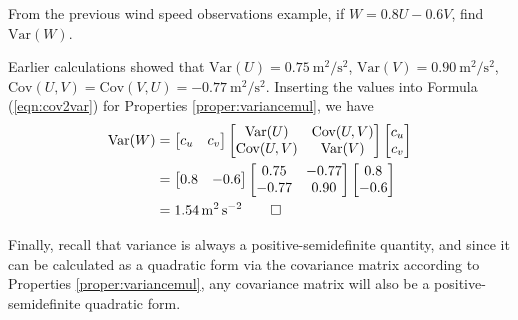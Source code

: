 \begin{exmp}
From the previous wind speed observations example, if $W = 0.8U-0.6V$, find $\text{Var}(W)$.
\end{exmp}
\begin{solution}
Earlier calculations showed that $\text{Var}(U) = \SI{0.75}{\square\m \per \square\s}$,
$\text{Var}(V) = \SI{0.90}{\square\m \per \square\s}$, $\text{Cov}(U,V) = \text{Cov}(V,U) = \SI{-0.77}{\square\m \per \square\s}$. Inserting the values into Formula  (\ref{eqn:cov2var}) for Properties \ref{proper:variancemul}, we have
\begin{align*}
\text{Var}(W) &=
\begin{bmatrix}
c_u & c_v
\end{bmatrix}
\begin{bmatrix}
\text{Var}(U) & \text{Cov}(U,V) \\
\text{Cov}(U,V) & \text{Var}(V)
\end{bmatrix}
\begin{bmatrix}
c_u \\
c_v
\end{bmatrix} \\
&=
\begin{bmatrix}
0.8 & -0.6
\end{bmatrix}
\begin{bmatrix}
0.75 & -0.77 \\
-0.77 & 0.90
\end{bmatrix}
\begin{bmatrix}
0.8 \\
-0.6
\end{bmatrix} \\
&= \SI{1.54}{\square\m \per \square\s} \qedhere
\end{align*} 
\end{solution}
Finally, recall that variance is always a positive-semidefinite quantity, and since it can be calculated as a quadratic form via the covariance matrix according to Properties \ref{proper:variancemul}, any covariance matrix will also be a positive-semidefinite quadratic form.

